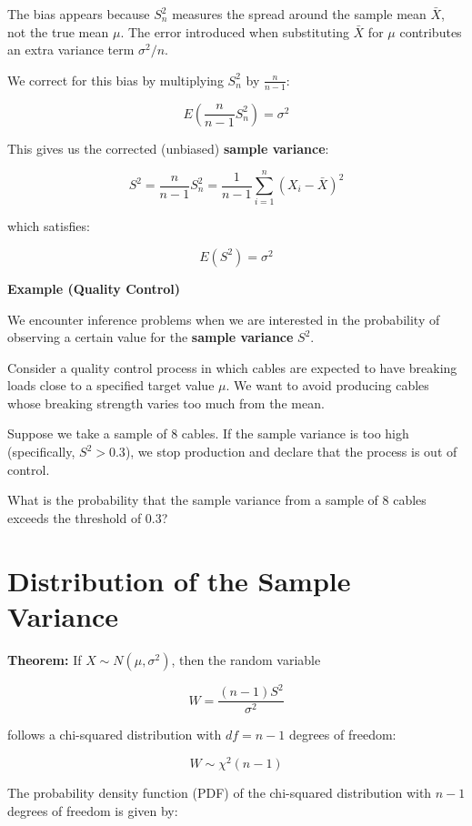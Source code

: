 \documentclass[
]{book}
\begin{document}
The bias appears because \(S_n^2\) measures the spread around the sample mean \(\bar{X}\), not the true mean \(\mu\). The error introduced when substituting \(\bar{X}\) for \(\mu\) contributes an extra variance term \(\sigma^2 / n\).

We correct for this bias by multiplying \(S_n^2\) by \(\frac{n}{n - 1}\):

\[
E\left( \frac{n}{n - 1} S_n^2 \right) = \sigma^2
\]

This gives us the corrected (unbiased) \textbf{sample variance}:

\[
S^2 = \frac{n}{n - 1} S_n^2 = \frac{1}{n - 1} \sum_{i=1}^n (X_i - \bar{X})^2
\]

which satisfies:

\[
E(S^2) = \sigma^2
\]

\textbf{Example (Quality Control)}

We encounter inference problems when we are interested in the probability of observing a certain value for the \textbf{sample variance} \(S^2\).

Consider a quality control process in which cables are expected to have breaking loads close to a specified target value \(\mu\). We want to avoid producing cables whose breaking strength varies too much from the mean.

Suppose we take a sample of 8 cables. If the sample variance is too high (specifically, \(S^2 > 0.3\)), we stop production and declare that the process is out of control.

What is the probability that the sample variance from a sample of 8 cables exceeds the threshold of \(0.3\)?

\hypertarget{distribution-of-the-sample-variance}{%
\section{Distribution of the Sample Variance}\label{distribution-of-the-sample-variance}}

\textbf{Theorem:} If \(X \sim N(\mu, \sigma^2)\), then the random variable

\[
W = \frac{(n - 1) S^2}{\sigma^2}
\]

follows a chi-squared distribution with \(df = n - 1\) degrees of freedom:

\[
W \sim \chi^2(n - 1)
\]

The probability density function (PDF) of the chi-squared distribution with \(n - 1\) degrees of freedom is given by:
\end{document}
